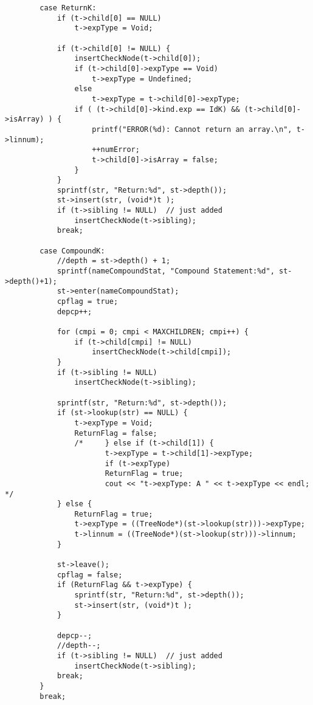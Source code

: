 \documentclass[12pt]{book}
\begin{document}
\begin{lstlisting}
        case ReturnK:  
            if (t->child[0] == NULL) 
                t->expType = Void;
      
            if (t->child[0] != NULL) {
                insertCheckNode(t->child[0]);
                if (t->child[0]->expType == Void)
                    t->expType = Undefined;
                else
                    t->expType = t->child[0]->expType;
                if ( (t->child[0]->kind.exp == IdK) && (t->child[0]->isArray) ) {
                    printf("ERROR(%d): Cannot return an array.\n", t->linnum);  
                    ++numError;
                    t->child[0]->isArray = false; 
                } 
            }
            sprintf(str, "Return:%d", st->depth());
            st->insert(str, (void*)t );
            if (t->sibling != NULL)  // just added
                insertCheckNode(t->sibling);
            break;

        case CompoundK:  
            //depth = st->depth() + 1;
            sprintf(nameCompoundStat, "Compound Statement:%d", st->depth()+1);
            st->enter(nameCompoundStat);
            cpflag = true;
            depcp++;

            for (cmpi = 0; cmpi < MAXCHILDREN; cmpi++) { 
                if (t->child[cmpi] != NULL) 
                    insertCheckNode(t->child[cmpi]);
            }
            if (t->sibling != NULL) 
                insertCheckNode(t->sibling);

            sprintf(str, "Return:%d", st->depth());
            if (st->lookup(str) == NULL) {
                t->expType = Void;
                ReturnFlag = false;
                /*     } else if (t->child[1]) {
                       t->expType = t->child[1]->expType;
                       if (t->expType)
                       ReturnFlag = true;
                       cout << "t->expType: A " << t->expType << endl;    */
            } else {
                ReturnFlag = true;
                t->expType = ((TreeNode*)(st->lookup(str)))->expType;
                t->linnum = ((TreeNode*)(st->lookup(str)))->linnum;
            }

            st->leave();
            cpflag = false;
            if (ReturnFlag && t->expType) {
                sprintf(str, "Return:%d", st->depth());
                st->insert(str, (void*)t );
            }

            depcp--;
            //depth--;
            if (t->sibling != NULL)  // just added
                insertCheckNode(t->sibling);
            break;
        }
        break;


\end{lstlisting}
\end{document}
